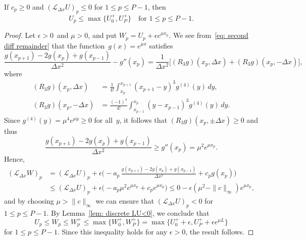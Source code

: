 \begin{theorem}\label{thm: discrete max principle}
If $c_p\ge0$ and $(\mathcal{L}_{\Delta x}U)_p\le0$ for $1\le p\le P-1$, then 
\[
U_p\le\max\{U_0^+,U_P^+\}\quad\text{for $1\le p\le P-1$.}
\]
\end{theorem}
\begin{proof}
Let $\epsilon>0$~and $\mu>0$, and put $W_p=U_p+\epsilon e^{\mu x_p}$.  
We see from~\eqref{eq: second diff remainder} that the 
function~$g(x)=e^{\mu x}$ satisfies
\[
\frac{g(x_{p+1})-2g(x_p)+g(x_{p-1})}{\Delta x^2}-g''(x_p)
	=\frac{1}{\Delta x^2}\bigl[(R_3g)(x_p,\Delta x)+(R_3g)(x_p,-\Delta x)\bigr],
\]
where
\begin{align*}
(R_3g)(x_p,\Delta x)
	&=\frac{1}{4!}\int_{x_p}^{x_{p+1}}(x_{p+1}-y)^3g^{(4)}(y)\,dy,\\
(R_3g)(x_p,-\Delta x)
	&=\frac{(-1)^4}{4!}\int_{x_{p-1}}^{x_p}(y-x_{p-1})^3g^{(4)}(y)\,dy.
\end{align*}
Since $g^{(4)}(y)=\mu^4e^{\mu y}\ge0$ for all~$y$, it follows that
$(R_3g)(x_p,\pm\Delta x)\ge0$ and thus
\[
\frac{g(x_{p+1})-2g(x_p)+g(x_{p-1})}{\Delta x^2}\ge g''(x_p)=\mu^2e^{\mu x_p}.
\]
Hence, 
\begin{align*}
(\mathcal{L}_{\Delta x}W)_p&=(\mathcal{L}_{\Delta x}U)_p
	+\epsilon\biggl(-a_p\,\frac{g(x_{p+1})-2g(x_p)+g(x_{p-1})}{\Delta x^2}
	+c_pg(x_p)\biggr)\\
	&\le (\mathcal{L}_{\Delta x}U)_p
		+\epsilon\bigl(-a_p\mu^2e^{\mu x_p}+c_pe^{\mu x_p}\bigr)
	\le0-\epsilon(\mu^2-\|c\|_\infty)e^{\mu x_p}, 
\end{align*}
and by choosing $\mu>\|c\|_\infty$ we can ensure that 
$(\mathcal{L}_{\Delta x}U)_p<0$ for~$1\le p\le P-1$.  By 
Lemma~\ref{lem: discrete LU<0}, we conclude that
\[
U_p\le W_p\le W_p^+\le\max\{W_0^+,W_P^+\}
	=\max\{U_0^++\epsilon,U_P^++\epsilon e^{\mu L}\}
\]
for $1\le p\le P-1$.  Since this inequality holds for any $\epsilon>0$, the 
result follows.
\end{proof}

